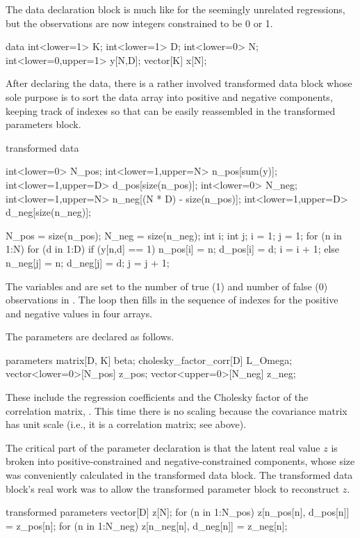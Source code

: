 The data declaration block is much like for the seemingly unrelated
regressions, but the observations  are now integers
constrained to be 0 or 1.
%
\begin{stancode}
data {
  int<lower=1> K;
  int<lower=1> D;
  int<lower=0> N;
  int<lower=0,upper=1> y[N,D];
  vector[K] x[N];
}
\end{stancode}

After declaring the data, there is a rather involved transformed data
block whose sole purpose is to sort the data array  into
positive and negative components, keeping track of indexes so that
 can be easily reassembled in the transformed parameters
block.
%
\begin{stancode}
transformed data {
  int<lower=0> N_pos;
  int<lower=1,upper=N> n_pos[sum(y)];
  int<lower=1,upper=D> d_pos[size(n_pos)];
  int<lower=0> N_neg;
  int<lower=1,upper=N> n_neg[(N * D) - size(n_pos)];
  int<lower=1,upper=D> d_neg[size(n_neg)];

  N_pos = size(n_pos);
  N_neg = size(n_neg);
  {
    int i;
    int j;
    i = 1;
    j = 1;
    for (n in 1:N) {
      for (d in 1:D) {
        if (y[n,d] == 1) {
          n_pos[i] = n;
          d_pos[i] = d;
          i = i + 1;
        } else {
          n_neg[j] = n;
          d_neg[j] = d;
          j = j + 1;
        }
      }
    }
  }
}
\end{stancode}
%
The variables  and  are set to the number of
true (1) and number of false (0) observations in .  The loop
then fills in the sequence of indexes for the positive and negative
values in four arrays.

The parameters are declared as follows.
%
\begin{stancode}
parameters {
  matrix[D, K] beta;
  cholesky_factor_corr[D] L_Omega;
  vector<lower=0>[N_pos] z_pos;
  vector<upper=0>[N_neg] z_neg;
}
\end{stancode}
%
These include the regression coefficients  and the Cholesky
factor of the correlation matrix, .  This time there is
no scaling because the covariance matrix has unit scale (i.e., it is a
correlation matrix;  see above). 

The critical part of the parameter declaration is that the latent real
value $z$ is broken into positive-constrained and negative-constrained
components, whose size was conveniently calculated in the transformed
data block.  The transformed data block's real work was to allow the
transformed parameter block to reconstruct $z$.
%
\begin{stancode}
transformed parameters {
  vector[D] z[N];
  for (n in 1:N_pos)
    z[n_pos[n], d_pos[n]] = z_pos[n];
  for (n in 1:N_neg)
    z[n_neg[n], d_neg[n]] = z_neg[n];
}
\end{stancode}

